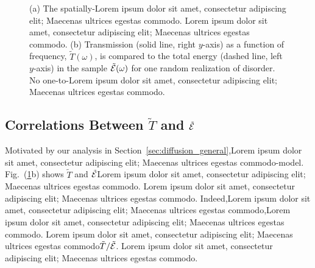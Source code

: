 \begin{figure}
\centerline{}
\centerline{}
\caption[(a) The spatially-Lorem ipsum dolor sit amet, consectetur adipiscing elit; Maecenas ultrices egestas commodo. Lorem ipsum dolor sit amet, consectetur adipiscing elit; Maecenas ultrices egestas commodo.]{
(a) The spatially-Lorem ipsum dolor sit amet, consectetur adipiscing elit; Maecenas ultrices egestas commodo. Lorem ipsum dolor sit amet, consectetur adipiscing elit; Maecenas ultrices egestas commodo. 
(b) Transmission (solid line, right $y$-axis) as a function of frequency, $\tilde{T}(\omega)$, is compared to the total energy (dashed line, left $y$-axis) in the sample $\tilde{\cal E}(\omega)$ for one random realization of disorder. No one-to-Lorem ipsum dolor sit amet, consectetur adipiscing elit; Maecenas ultrices egestas commodo.
\label{fig:electricFieldInSample}
}
\end{figure}

\subsection{Correlations Between \texorpdfstring{$\tilde{T}$}{T} and \texorpdfstring{$\tilde{\cal E}$}{E}}
\label{sec:correlation_te}

Motivated by our analysis in Section~\ref{sec:diffusion_general},Lorem ipsum dolor sit amet, consectetur adipiscing elit; Maecenas ultrices egestas commodo-model. Fig.~(\ref{fig:electricFieldInSample}b) shows $\tilde{T}$ and $\tilde{\cal E}$Lorem ipsum dolor sit amet, consectetur adipiscing elit; Maecenas ultrices egestas commodo. Lorem ipsum dolor sit amet, consectetur adipiscing elit; Maecenas ultrices egestas commodo. Indeed,Lorem ipsum dolor sit amet, consectetur adipiscing elit; Maecenas ultrices egestas commodo,Lorem ipsum dolor sit amet, consectetur adipiscing elit; Maecenas ultrices egestas commodo. Lorem ipsum dolor sit amet, consectetur adipiscing elit; Maecenas ultrices egestas commodo$\tilde{T}/\tilde{\cal E}$. Lorem ipsum dolor sit amet, consectetur adipiscing elit; Maecenas ultrices egestas commodo.

